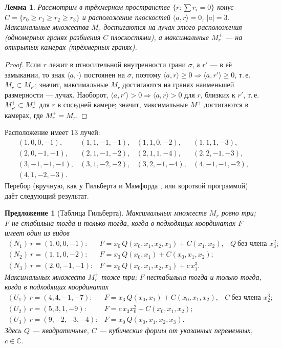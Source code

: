 \documentclass[11pt,a4paper]{article}
\theoremstyle{plain}
\newtheorem{proposition}[theorem]{Предложение}
\newtheorem{lemma}[theorem]{Лемма}
\theoremstyle{definition}
\theoremstyle{remark}
\renewcommand{\C}{\mathbb{C}}
\begin{document}
\begin{lemma}\label{lem:rays}
Рассмотрим в трёхмерном пространстве $\{r:\sum r_i=0\}$ конус $C=\{r_0\ge r_1\ge r_2\ge r_3\}$ и
расположение плоскостей $\langle a,r\rangle=0$, $|a|=3$. Максимальные множества $M_r$ достигаются
на \emph{лучах} этого расположения \textup{(}одномерных гранях разбиения $C$ плоскостями\textup{)}, а максимальные
$M_r^+$ --- на открытых камерах \textup{(}трёхмерных гранях\textup{)}.
\end{lemma}
\begin{proof}
Если $r$ лежит в относительной внутренности грани $\sigma$, а $r'$ --- в её замыкании, то знак
$\langle a,\cdot\rangle$ постоянен на $\sigma$, поэтому $\langle a,r\rangle\ge0\Rightarrow
\langle a,r'\rangle\ge0$, т.\,е. $M_r\subset M_{r'}$; значит, максимальные $M_r$ достигаются на гранях
наименьшей размерности --- лучах. Наоборот, $\langle a,r'\rangle>0\Rightarrow\langle a,r\rangle>0$ для
$r$, близких к $r'$, т.\,е. $M^+_{r'}\subset M^+_r$ для $r$ в соседней камере; значит, максимальные
$M^+$ достигаются в камерах, где $M^+_r=M_r$.
\end{proof}

Расположение имеет 13 лучей:
\[
\begin{array}{llll}
(1,0,0,-1),&(1,1,-1,-1),&(1,1,0,-2),&(1,1,1,-3),\\
(2,0,-1,-1),&(2,1,-1,-2),&(2,1,1,-4),&(2,2,-1,-3),\\
(3,-1,-1,-1),&(3,1,-2,-2),&(3,2,-1,-4),&(4,-1,-1,-2),\\
(4,1,-2,-3).&&&
\end{array}
\]
Перебор (вручную, как у Гильберта и Мамфорда \cite[гл.~4, \S\,2]{MFK}, или короткой программой)
даёт следующий результат.

\begin{proposition}[Таблица Гильберта]\label{prop:Hilbert-table}
Максимальных множеств $M_r$ ровно три; $F$ не стабильна тогда и только тогда, когда в подходящих
координатах $F$ имеет один из видов
\[
\begin{array}{lll}
(N_1)\ r=(1,0,0,-1): & F=x_0\,Q(x_0,x_1,x_2,x_3)+C(x_1,x_2), & Q\ \text{без члена } x_3^2;\\
(N_2)\ r=(1,1,0,-2): & F=x_3\,Q(x_0,x_1)+C(x_0,x_1,x_2); &\\
(N_3)\ r=(2,0,-1,-1): & F=x_0\,Q(x_0,x_1,x_2,x_3)+c\,x_1^3. &
\end{array}
\]
Максимальных множеств $M_r^+$ тоже три; $F$ нестабильна тогда и только тогда, когда в подходящих
координатах
\[
\begin{array}{lll}
(U_1)\ r=(4,4,-1,-7): & F=x_3\,Q(x_0,x_1)+C(x_0,x_1,x_2), & C\ \text{без члена } x_2^3;\\
(U_2)\ r=(5,3,1,-9): & F=c\,x_3x_0^2+C(x_0,x_1,x_2); &\\
(U_3)\ r=(9,-2,-3,-4): & F=x_0\,Q(x_0,x_1,x_2,x_3). &
\end{array}
\]
Здесь $Q$ --- квадратичные, $C$ --- кубические формы от указанных переменных, $c\in\C$.
\end{proposition}
\end{document}
